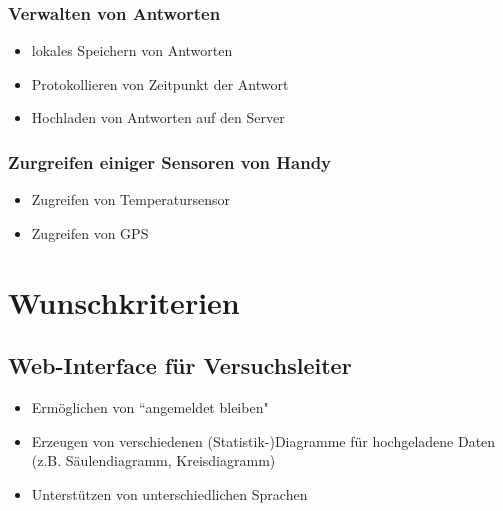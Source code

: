 \documentclass[a4paper]{scrreprt}
\begin{document}
                \subsubsection{Verwalten von Antworten}
                    \begin{itemize}
                        \item lokales Speichern von Antworten
                        \item Protokollieren von Zeitpunkt der Antwort
                        \item Hochladen von Antworten auf den Server
                    \end{itemize}

                \subsubsection{Zurgreifen einiger Sensoren von Handy}
                    \begin{itemize}
                        \item Zugreifen von Temperatursensor
                        \item Zugreifen von GPS
                    \end{itemize}
                \vspace*{0.5cm}


        \section{Wunschkriterien}
            \vspace*{0.3cm}

            \subsection{Web-Interface f\"ur Versuchsleiter}
                \begin{itemize}
                    \item Erm\"oglichen von ``angemeldet bleiben"
                    \item Erzeugen von verschiedenen (Statistik-)Diagramme f\"ur hochgeladene Daten (z.B. S\"aulendiagramm, Kreisdiagramm)
                    \item Unterst\"utzen von unterschiedlichen Sprachen

                \end{itemize}
\end{document}
